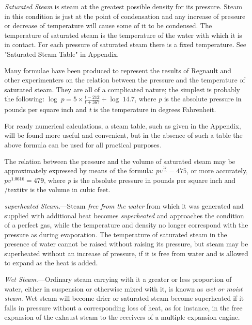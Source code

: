 \documentclass[11pt, a5paper]{book}
\begin{document}
\textit{Saturated Steam} is steam at the greatest possible density for
its pressure.  Steam in this condition is just at the point of
condensation and any increase of pressure or decrease of temperature
will cause some of it to be condensed.  The temperature of saturated
steam is the temperature of the water with which it is in contact.
For each pressure of saturated steam there is a fixed temperature.
See "Saturated Steam Table" in Appendix.\par

Many formulae have been produced to represent the results of Regnault
and other experimenters on the relation between the pressure and the
temperature of saturated steam.  They are all of a complicated nature;
the simplest is probably the following:
$\log\; p=5\times\frac{t-212}{t+367}+\log\; 14.7$,
where \textit{p} is the
absolute pressure in pounds per square inch and \textit{t} is the
temperature in degrees Fahrenheit.\par

For ready numerical calculations, a steam table, such as given in the
Appendix, will be found more useful and convenient, but in the absence
of such a table the above formula can be used for all practical
purposes.\par

The relation between the pressure and the volume of saturated steam
may be approximately expressed by means of the formula:
$pv^\frac{17}{16} = 475$, or more accurately, $pv^1.0616 = 479$, where
\textit{p} is the absolute pressure in pounds per square inch and
/textit{v} is the volume in cubic feet.\par

\textit{superheated Steam}.---Steam \textit{free from the water} from
which it was generated and supplied with additional heat becomes
\textit{superheated} and approaches the condition of a perfect gas,
while the temperature and density no longer correspond with the
pressure as during evaporation.  The temperature of saturated steam in
the presence of water cannot be raised without raising its pressure,
but steam may be superheated without an increase of pressure, if it is
free from water and is allowed to expand as the heat is added.\par

\textit{Wet Steam}.---Ordinary steam carrying with it a greater or
less proportion of water, either in suspension or otherwise mixed with
it, is known as \textit{wet or moist steam}.  Wet steam will become
drier or saturated steam become superheated if it falls in pressure
without a corresponding loss of heat, as for instance, in the free
expansion of the exhaust steam to the receivers of a multiple
expansion engine.\par
\end{document}
